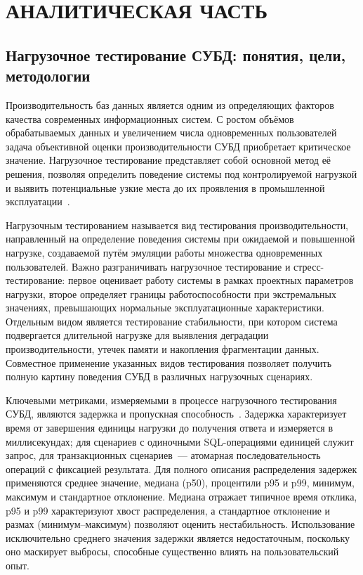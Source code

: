 \section{АНАЛИТИЧЕСКАЯ ЧАСТЬ}

\subsection{Нагрузочное тестирование СУБД: понятия, цели, методологии}

Производительность баз данных является одним из определяющих факторов качества современных информационных систем. С ростом объёмов обрабатываемых данных и увеличением числа одновременных пользователей задача объективной оценки производительности СУБД приобретает критическое значение. Нагрузочное тестирование представляет собой основной метод её решения, позволяя определить поведение системы под контролируемой нагрузкой и выявить потенциальные узкие места до их проявления в промышленной эксплуатации~\cite{gregg_2020}.

Нагрузочным тестированием называется вид тестирования производительности, направленный на определение поведения системы при ожидаемой и повышенной нагрузке, создаваемой путём эмуляции работы множества одновременных пользователей. Важно разграничивать нагрузочное тестирование и стресс-тестирование: первое оценивает работу системы в рамках проектных параметров нагрузки, второе определяет границы работоспособности при экстремальных значениях, превышающих нормальные эксплуатационные характеристики. Отдельным видом является тестирование стабильности, при котором система подвергается длительной нагрузке для выявления деградации производительности, утечек памяти и накопления фрагментации данных. Совместное применение указанных видов тестирования позволяет получить полную картину поведения СУБД в различных нагрузочных сценариях.

Ключевыми метриками, измеряемыми в процессе нагрузочного тестирования СУБД, являются задержка и пропускная способность~\cite{kleppmann_2017}. Задержка характеризует время от завершения единицы нагрузки до получения ответа и измеряется в миллисекундах; для сценариев с одиночными SQL-операциями единицей служит запрос, для транзакционных сценариев~--- атомарная последовательность операций с фиксацией результата. Для полного описания распределения задержек применяются среднее значение, медиана (p50), процентили p95 и p99, минимум, максимум и стандартное отклонение. Медиана отражает типичное время отклика, p95 и p99 характеризуют хвост распределения, а стандартное отклонение и размах (минимум--максимум) позволяют оценить нестабильность. Использование исключительно среднего значения задержки является недостаточным, поскольку оно маскирует выбросы, способные существенно влиять на пользовательский опыт.

